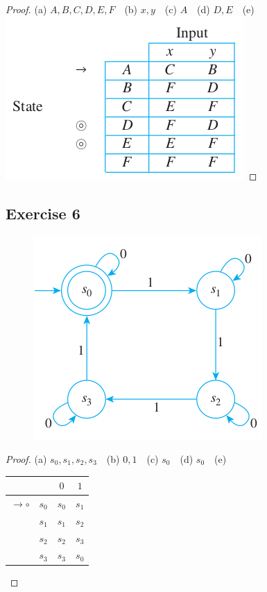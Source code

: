 \documentclass[14pt]{extarticle}
\begin{document}
\begin{proof}
(a) \(A, B, C, D, E, F\) \,\, (b) \(x, y\) \,\, (c) \(A\) \,\, 
(d) \(D, E\) \,\, (e)
\includegraphics[scale=0.5]{../images/12.2.5.e.png}
\end{proof}

\subsection{Exercise 6}
\begin{figure}[ht!]
\centering
\includegraphics[scale=0.5]{../images/12.2.6.png}
\end{figure}

\begin{proof}
(a) \(s_0, s_1, s_2, s_3\) \,\, (b) \(0, 1\) \,\, (c) \(s_0\) \,\, (d) \(s_0\) \,\, (e) 
\begin{tabular}{|c|c|c|c|}
\hline
\(\) & \(\) & \(0\) & \(1\) \\
\hline
\(\to \circ\) & \(s_0\) & \(s_0\) & \(s_1\) \\
\hline
\(\) & \(s_1\) & \(s_1\) & \(s_2\) \\
\hline
\(\) & \(s_2\) & \(s_2\) & \(s_3\) \\
\hline
\(\) & \(s_3\) & \(s_3\) & \(s_0\) \\
\hline
\end{tabular}
\end{proof}
\end{document}
